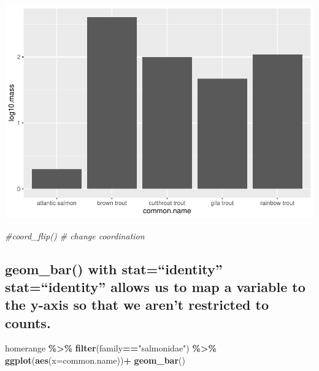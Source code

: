 \documentclass[
]{article}
\newenvironment{Shaded}{\begin{snugshade}}{\end{snugshade}}
\newcommand{\AttributeTok}[1]{\textcolor[rgb]{0.13,0.29,0.53}{#1}}
\newcommand{\CommentTok}[1]{\textcolor[rgb]{0.56,0.35,0.01}{\textit{#1}}}
\newcommand{\FunctionTok}[1]{\textcolor[rgb]{0.13,0.29,0.53}{\textbf{#1}}}
\newcommand{\NormalTok}[1]{#1}
\newcommand{\SpecialCharTok}[1]{\textcolor[rgb]{0.81,0.36,0.00}{\textbf{#1}}}
\newcommand{\StringTok}[1]{\textcolor[rgb]{0.31,0.60,0.02}{#1}}
\begin{document}
\includegraphics{Untitled_files/figure-latex/unnamed-chunk-21-1.pdf}

\begin{Shaded}
\begin{Highlighting}[]
  \CommentTok{\#coord\_flip() \# change coordination}
\end{Highlighting}
\end{Shaded}

\hypertarget{geom_bar-with-statidentity-statidentity-allows-us-to-map-a-variable-to-the-y-axis-so-that-we-arent-restricted-to-counts.}{%
\subsection{geom\_bar() with stat=``identity'' stat=``identity'' allows
us to map a variable to the y-axis so that we aren't restricted to
counts.}\label{geom_bar-with-statidentity-statidentity-allows-us-to-map-a-variable-to-the-y-axis-so-that-we-arent-restricted-to-counts.}}

\begin{Shaded}
\begin{Highlighting}[]
\NormalTok{homerange }\SpecialCharTok{\%\textgreater{}\%} 
  \FunctionTok{filter}\NormalTok{(family}\SpecialCharTok{==}\StringTok{"salmonidae"}\NormalTok{) }\SpecialCharTok{\%\textgreater{}\%} 
  \FunctionTok{ggplot}\NormalTok{(}\FunctionTok{aes}\NormalTok{(}\AttributeTok{x=}\NormalTok{common.name))}\SpecialCharTok{+}
  \FunctionTok{geom\_bar}\NormalTok{()}
\end{Highlighting}
\end{Shaded}
\end{document}
